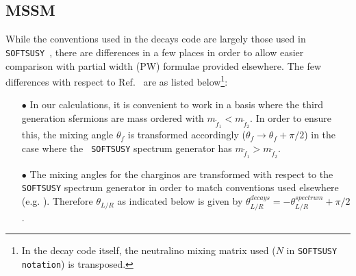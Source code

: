 \documentclass[final,3p,times,pdflatex]{elsarticle}
\begin{document}
\subsection{MSSM} \label{MSSMconventions}
While the conventions used in the decays code are largely those used in {\tt
  SOFTSUSY}~\cite{Allanach:2001kg}, there are differences in a few places in
order to allow easier comparison with partial width (PW) formulae provided
elsewhere. The few differences with respect to Ref.~\cite{Allanach:2001kg} are
as listed below\footnote{In the decay code itself, the neutralino mixing
  matrix used ($N$ in {\tt SOFTSUSY notation}) is transposed.}: 
\begin{itemize}
	\item[$\bullet$] In our calculations, it is convenient to work in a
          basis where the third generation sfermions are mass
          ordered with $m_{\tilde{f}_1} < m_{\tilde{f}_2}$. In order to ensure
          this, the mixing angle $\theta_f$ is transformed accordingly
          ($\theta_f \rightarrow \theta_f + \pi/2$) in the case where the {\tt
            SOFTSUSY} spectrum generator has $m_{\tilde{f}_1} >
          m_{\tilde{f}_2}$. 
	\item[$\bullet$] The mixing angles for the charginos are transformed
          with respect to the {\tt SOFTSUSY} spectrum generator in order to
          match conventions used elsewhere
          (e.g. \cite{Djouadi:2002ze}). Therefore $\theta_{L/R}$ as indicated
          below is given by $\theta_{L/R}^{decays} = -\theta_{L/R}^{spectrum}
          + \pi/2$. 
\end{itemize}
\end{document}

